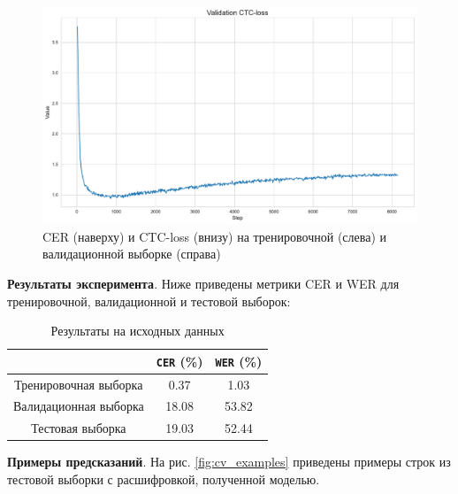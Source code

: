 \documentclass{extarticle}
\begin{document}
\begin{figure}[h!]
\begin{minipage}{0.49\textwidth}
	\end{minipage}
	\begin{minipage}{0.49\textwidth}
		\centering
		\includegraphics[width=\textwidth]{images/valid_loss.pdf}
	\end{minipage}
	
	\caption{CER (наверху) и CTC-loss (внизу) на тренировочной (слева) и валидационной выборке (справа)}
	
	\label{fig:metrics_train_val}
\end{figure}


\textbf{Результаты эксперимента}. Ниже приведены метрики CER и WER для тренировочной, валидационной и тестовой выборок:

\begin{table}[H]
	\centering
	\begin{tabular}{|c|c|c|}
		\hline
		& \texttt{CER} (\%) & \texttt{WER} (\%) \\
		\hline
		Тренировочная выборка & 0.37 & 1.03 \\
		\hline
		Валидационная выборка & 18.08 & 53.82 \\
		\hline
		Тестовая выборка & 19.03 & 52.44 \\
		\hline
	\end{tabular}
	\caption{Результаты на исходных данных}
	\label{tab:results_rgb}
\end{table}

\textbf{Примеры предсказаний}. На рис. \ref{fig:cv_examples} приведены примеры строк из тестовой выборки с расшифровкой, полученной моделью.
\end{document}
